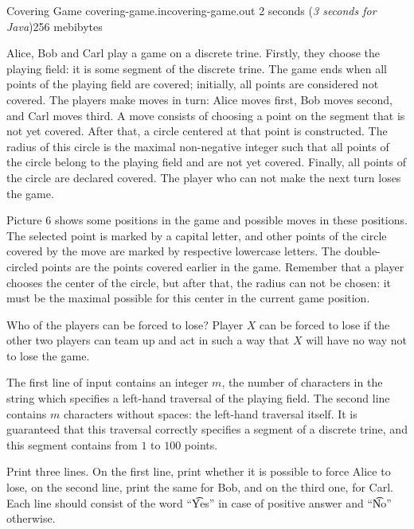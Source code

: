 \gdef\thisproblemauthor{Ivan Kazmenko}
\gdef\thisproblemdeveloper{Ivan Kazmenko}
\begin{problem}{Covering Game}
{covering-game.in}{covering-game.out}
{2 seconds (\textsl{3 seconds for Java})}{256 mebibytes}{}


Alice, Bob and Carl play a game on a discrete trine.
Firstly, they choose the playing field: it is some segment
of the discrete trine.
The game ends when all points of the playing field are covered;
initially, all points are considered not covered.
The players make moves in turn:
Alice moves first, Bob moves second, and Carl moves third.
A move consists of choosing a point on the segment that is not yet covered.
After that, a circle centered at that point is constructed.
The radius of this circle is the maximal non-negative integer such that
all points of the circle belong to the playing field and are not yet covered.
Finally, all points of the circle are declared covered.
The player who can not make the next turn loses the game.

Picture 6 shows some positions in the game and possible moves
in these positions.
The selected point is marked by a capital letter, and other points
of the circle covered by the move are marked by respective lowercase letters.
The double-circled points are the points covered earlier in the game.
Remember that a player chooses the center of the circle, but after that,
the radius can not be chosen: it must be the maximal possible for this center
in the current game position.


Who of the players can be forced to lose?
Player $X$ can be forced to lose if the other two players can team up
and act in such a way that $X$ will have no way not to lose the game.

\InputFile

The first line of input contains an integer $m$, the number of characters
in the string which specifies a left-hand traversal of the playing field.
The second line contains $m$ characters without spaces:
the left-hand traversal itself.
It is guaranteed that this traversal correctly specifies a segment
of a discrete trine, and this segment contains from $1$ to $100$ points.

\OutputFile

Print three lines.
On the first line, print whether it is possible to force Alice to lose,
on the second line, print the same for Bob, and on the third one, for Carl.
Each line should consist of the word ``\t{Yes}'' in case of positive answer
and ``\t{No}'' otherwise.


\end{problem}
